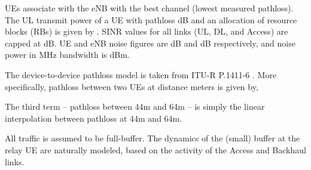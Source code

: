 \documentclass[journal]{IEEEtran}
\begin{document}
UEs associate with the eNB with the best channel (lowest measured pathloss).  The UL transmit power of a UE with pathloss  dB and an allocation of  resource blocks (RBs) is given by .  SINR values for all links (UL, DL, and Access) are capped at  dB. UE and eNB noise figures are  dB and  dB respectively, and noise power in MHz bandwidth is  dBm.

The device-to-device pathloss model is taken from ITU-R P.1411-6 \cite{ITU1411}. More specifically, pathloss between two UEs at distance  meters is given by,

The third term -- pathloss between 44m and 64m -- is simply the linear interpolation between pathloss at 44m and 64m.

All traffic is assumed to be full-buffer.  The dynamics of the (small) buffer at the relay UE are naturally modeled, based on the activity of the Access and Backhaul links.
\end{document}
